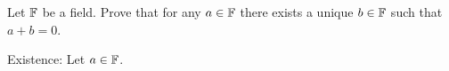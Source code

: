\begin{problem}
  Let $\mathbb{F}$ be a field.
  Prove that for any $a \in \mathbb{F}$ there exists a unique $b \in \mathbb{F}$
  such that $a + b = 0$.
\end{problem}

\begin{answer}
  \begin{enumroman}
    \item Existence: Let $a \in \mathbb{F}$.
      
  \end{enumroman}
\end{answer}
